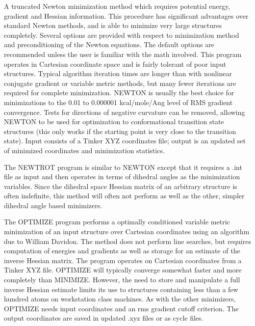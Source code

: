 \documentclass[letterpaper,11pt,english]{sphinxmanual}
\begin{document}
A truncated Newton minimization method which requires potential energy, gradient and Hessian information. This procedure has significant advantages over standard Newton methods, and is able to minimize very large structures completely. Several options are provided with respect to minimization method and preconditioning of the Newton equations. The default options are recommended unless the user is familiar with the math involved. This program operates in Cartesian coordinate space and is fairly tolerant of poor input structures. Typical algorithm iteration times are longer than with nonlinear conjugate gradient or variable metric methods, but many fewer iterations are required for complete minimization. NEWTON is usually the best choice for minimizations to the 0.01 to 0.000001 kcal/mole/Ang level of RMS gradient convergence. Tests for directions of negative curvature can be removed, allowing NEWTON to be used for optimization to conformational transition state structures (this only works if the starting point is very close to the transition state). Input consists of a Tinker XYZ coordinates file; output is an updated set of minimized coordinates and minimization statistics.


The NEWTROT program is similar to NEWTON except that it requires a .int file as input and then operates in terms of dihedral angles as the minimization variables. Since the dihedral space Hessian matrix of an arbitrary structure is often indefinite, this method will often not perform as well as the other, simpler dihedral angle based minimizers.


The OPTIMIZE program performs a optimally conditioned variable metric minimization of an input structure over Cartesian coordinates using an algorithm due to William Davidon. The method does not perform line searches, but requires computation of energies and gradients as well as storage for an estimate of the inverse Hessian matrix. The program operates on Cartesian coordinates from a Tinker XYZ file. OPTIMIZE will typically converge somewhat faster and more completely than MINIMIZE. However, the need to store and manipulate a full inverse Hessian estimate limits its use to structures containing less than a few hundred atoms on workstation class machines. As with the other minimizers, OPTIMIZE needs input coordinates and an rms gradient cutoff criterion. The output coordinates are saved in updated .xyz files or as cycle files.
\end{document}
